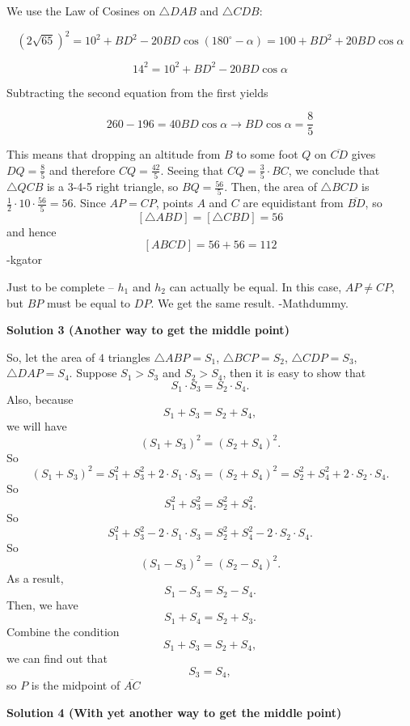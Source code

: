 \begin{enumerate}
 We use the Law of Cosines on $\triangle DAB$ and $\triangle CDB$:

 
 \[\left(2\sqrt{65}\right)^2 = 10^2 + BD^2 - 20BD\cos\left(180^\circ - \alpha\right) = 100 + BD^2 + 20BD\cos\alpha\]

 \[14^2 = 10^2 + BD^2 - 20BD\cos\alpha\]

 Subtracting the second equation from the first yields

 
 \[260 - 196 = 40BD\cos\alpha \rightarrow BD\cos\alpha = \frac{8}{5}\]

 This means that dropping an altitude from $B$ to some foot $Q$ on $\overline{CD}$ gives $DQ = \frac{8}{5}$ and therefore $CQ = \frac{42}{5}$. Seeing that $CQ = \frac{3}{5}\cdot BC$, we conclude that $\triangle QCB$ is a 3-4-5 right triangle, so $BQ = \frac{56}{5}$. Then, the area of $\triangle BCD$ is $\frac{1}{2}\cdot 10 \cdot \frac{56}{5} = 56$. Since $AP = CP$, points $A$ and $C$ are equidistant from $\overline{BD}$, so 
 \[\left[\triangle ABD\right] = \left[\triangle CBD\right] = 56\] and hence 
 \[\left[ABCD\right] = 56 + 56 = \boxed{112}\] -kgator

 
Just to be complete -- $h_1$ and $h_2$ can actually be equal. In this case, $AP \neq CP$, but $BP$ must be equal to $DP$. We get the same result. -Mathdummy.

 



\textbf{Solution 3 (Another way to get the middle point)}

So, let the area of $4$ triangles $\triangle {ABP}=S_{1}$,  $\triangle {BCP}=S_{2}$,  $\triangle {CDP}=S_{3}$,  $\triangle {DAP}=S_{4}$. Suppose $S_{1}>S_{3}$ and $S_{2}>S_{4}$, then it is easy to show that 
 \[S_{1}\cdot S_{3}=S_{2}\cdot S_{4}.\] Also, because 
 \[S_{1}+S_{3}=S_{2}+S_{4},\] we will have 
 \[(S_{1}+S_{3})^2=(S_{2}+S_{4})^2.\] So 
 \[(S_{1}+S_{3})^2=S_{1}^2+S_{3}^2+2\cdot S_{1}\cdot S_{3}=(S_{2}+S_{4})^2=S_{2}^2+S_{4}^2+2\cdot S_{2}\cdot S_{4}.\] So 
 \[S_{1}^2+S_{3}^2=S_{2}^2+S_{4}^2.\] So 
 \[S_{1}^2+S_{3}^2-2\cdot S_{1}\cdot S_{3}=S_{2}^2+S_{4}^2-2\cdot S_{2}\cdot S_{4}.\] So 
 \[(S_{1}-S_{3})^2=(S_{2}-S_{4})^2.\] As a result, 
 \[S_{1}-S_{3}=S_{2}-S_{4}.\] Then, we have 
 \[S_{1}+S_{4}=S_{2}+S_{3}.\] Combine the condition 
 \[S_{1}+S_{3}=S_{2}+S_{4},\] we can find out that 
 \[S_{3}=S_{4},\] so $P$ is the midpoint of $\overline {AC}$




\textbf{Solution 4 (With yet another way to get the middle point)}


\end{enumerate}
